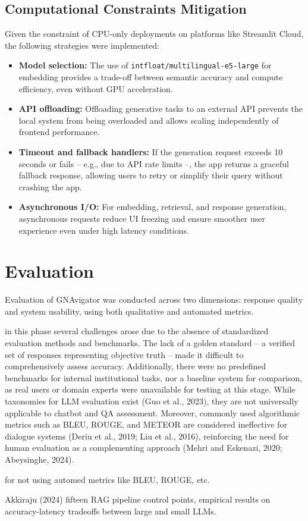 \begin{spacing}{1.5}
\subsection{Computational Constraints Mitigation}
Given the constraint of CPU-only deployments on platforms like Streamlit Cloud, the following strategies were implemented:
\begin{itemize}
\item \textbf{Model selection:} The use of \texttt{intfloat/multilingual-e5-large} for embedding provides a trade-off between semantic accuracy and compute efficiency, even without GPU acceleration.
\item \textbf{API offloading:} Offloading generative tasks to an external API prevents the local system from being overloaded and allows scaling independently of frontend performance.
\item \textbf{Timeout and fallback handlers:} If the generation request exceeds 10 seconds or fails -- e.g., due to API rate limits --, the app returns a graceful fallback response, allowing users to retry or simplify their query without crashing the app.
\item \textbf{Asynchronous I/O:} For embedding, retrieval, and response generation, asynchronous requests reduce UI freezing and ensure smoother user experience even under high latency conditions.
\end{itemize}

\section{Evaluation}
Evaluation of GNAvigator was conducted across two dimensions: response quality and system usability, using both qualitative and automated metrics.

in this phase several challenges arose due to the absence of standardized
evaluation methods and benchmarks. The lack of a golden standard – a verified set of responses representing objective truth – made it difficult to comprehensively assess accuracy. Additionally, there were no predefined benchmarks for internal institutional tasks, nor a baseline system for comparison, as real users or domain experts were unavailable for testing at this stage. While taxonomies for LLM evaluation exist (Guo et al., 2023), they are not universally applicable to chatbot and QA assessment. Moreover,
commonly used algorithmic metrics such as BLEU, ROUGE, and METEOR are
considered ineffective for dialogue systems (Deriu et al., 2019; Liu et al., 2016), reinforcing the need for human evaluation as a complementing approach (Mehri and
Eskenazi, 2020; Abeysinghe, 2024).

\citep{liu_how_2016} for not using automed metrics like BLEU, ROUGE, etc.

Akkiraju (2024) fifteen RAG pipeline control points, empirical results on accuracy-latency tradeoffs between large and small LLMs.


\end{spacing}